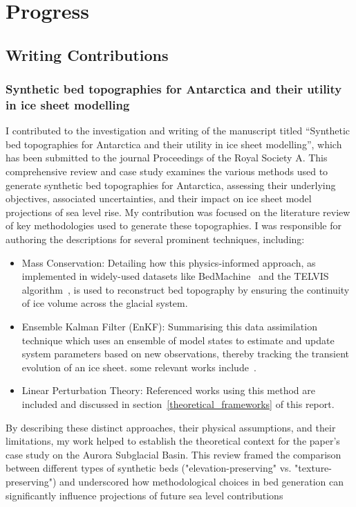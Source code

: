 \chapter{Progress}\label{progress}
\section{Writing Contributions}
\subsection{Synthetic bed topographies for Antarctica and their utility in ice sheet modelling}
I contributed to the investigation and writing of the manuscript titled ``Synthetic bed topographies for Antarctica and their utility in ice sheet modelling'', which has been submitted to the journal Proceedings of the Royal Society A. This comprehensive review and case study examines the various methods used to generate synthetic bed topographies for Antarctica, assessing their underlying objectives, associated uncertainties, and their impact on ice sheet model projections of sea level rise.
My contribution was focused on the literature review of key methodologies used to generate these topographies. I was responsible for authoring the descriptions for several prominent techniques, including:

\begin{itemize}
\item{Mass Conservation}: Detailing how this physics-informed approach, as implemented in widely-used datasets like BedMachine~\cite{Morlighem_2020} and the TELVIS algorithm~\cite{TELVIS_2011}, is used to reconstruct bed topography by ensuring the continuity of ice volume across the glacial system.
\item{Ensemble Kalman Filter (EnKF)}: Summarising this data assimilation technique which uses an ensemble of model states to estimate and update system parameters based on new observations, thereby tracking the transient evolution of an ice sheet. some relevant works include~\cite{Gillet-Chaulet_2020, Choi_2025}.
\item{Linear Perturbation Theory}: Referenced works using this method are included and discussed in section~\ref{theoretical_frameworks} of this report.
\end{itemize}

By describing these distinct approaches, their physical assumptions, and their limitations, my work helped to establish the theoretical context for the paper's case study on the Aurora Subglacial Basin. This review framed the comparison between different types of synthetic beds ("elevation-preserving" vs. "texture-preserving") and underscored how methodological choices in bed generation can significantly influence projections of future sea level contributions

